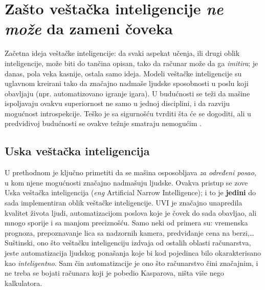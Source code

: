 \documentclass[a4paper]{article}
\begin{document}
\newpage

\section{Zašto veštačka inteligencije \textit{ne može} da zameni čoveka}	
\label{poglavlje:ton}
Začetna ideja veštačke inteligencije: da svaki aspekat učenja, ili drugi oblik inteligencije, može biti do tančina opisan, tako da računar može da ga \emph{imitira}\cite{mitedu}; je danas, pola veka kasnije, ostala samo ideja. Modeli veštačke inteligencije su uglavnom kreirani tako da značajno nadmaše ljudske sposobnosti u poslu koji obavljaju\cite{floridi} (npr. automatizovano igranje igara). U budućnosti se teži da mašine ispoljavaju ovakvu superiornost ne samo u jednoj disciplini, i da razviju mogućnost introspekcije. Teško je sa sigurnošću tvrditi šta će se dogoditi, ali u predvidivoj budućnosti se ovakve težnje smatraju nemogućim \cite{fjelland}. 

\subsection{Uska veštačka inteligencija}
U prethodnom je ključno primetiti da se mašina osposobljava \emph{za određeni posao}, u kom njene mogućnosti značajno nadmašuju ljudske. Ovakva pristup se zove Uska veštačka inteligencija (\emph{eng} Artificial Narrow Intelligence); i to je \textbf{jedini} do sada implementiran oblik veštačke inteligencije. UVI je značajno unapredila kvalitet života ljudi, automatizacijom poslova koje je čovek do sada obavljao, ali mnogo sporije i sa manjom preciznošću. Samo neki od primera su: vremenska prognoza, prepoznavanje lica sa nadzornih kamera, predviđanje cena na berzi,\dots\\

Suštinski, ono što veštačku inteligenciju izdvaja od ostalih oblasti računarstva, jeste automatizacija ljudskog ponašanja koje bi kod pojedinca bilo okarakterisano kao \emph{inteligentno}. Sam čin automatizacije je ono što računarstvo čini značajnim, i ne treba se bojati računara koji je pobedio Kasparova, ništa više nego kalkulatora.\\
\end{document}
